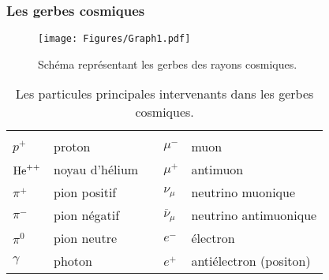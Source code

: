 \documentclass[a4paper, 12pt]{article}
\begin{document}
\begin{spacing}{1.5}
\subsubsection{Les gerbes cosmiques}

\begin{figure}[t]
\begin{center}
\texttt{[image: Figures/Graph1.pdf]} 
\end{center}
\vspace{-0.8cm}
\caption{\label{fig:GerbesCosmiquesG1} Schéma représentant les gerbes des rayons cosmiques.}
\end{figure}
\begin{table}[t]
\begin{center}
\begin{tabular}{lllll}
  \hline
  &&&&\\[-0.3cm]
  $p^+$ & proton &\hspace{2cm} & $\mu^-$ & muon\\[0.1cm]
  ${\rm {He}^{++}}$ & noyau d'hélium & & $\mu^+$ & antimuon\\[0.1cm]
  $\pi^+$ & pion positif & & $\nu_\mu$ & neutrino muonique\\[0.1cm]
  $\pi^-$ & pion négatif & & ${\overline \nu}_\mu$ & neutrino antimuonique\\[0.1cm]
  $\pi^0$ & pion neutre & & $e^-$ & électron\\[0.1cm]
  $\gamma$ & photon & & $e^+$ & antiélectron (positon)\\[0.2cm]
  \hline
\end{tabular}
\end{center}
\vspace{-0.3cm}
\caption{\label{tab:TableGerbesCosmiquesNoyaux} Les particules principales intervenants dans les gerbes cosmiques.}
\end{table}

\end{spacing}
\end{document}
